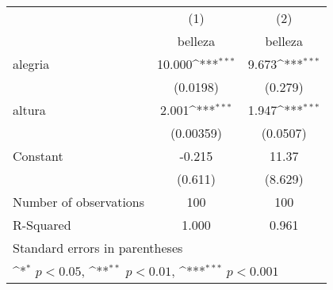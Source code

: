 {
\def\sym#1{\ifmmode^{#1}\else\(^{#1}\)\fi}
\begin{tabular}{l*{2}{c}}
\hline\hline
                    &\multicolumn{1}{c}{(1)}&\multicolumn{1}{c}{(2)}\\
                    &\multicolumn{1}{c}{belleza}&\multicolumn{1}{c}{belleza}\\
\hline
alegria             &      10.000\sym{***}&       9.673\sym{***}\\
                    &    (0.0198)         &     (0.279)         \\
[1em]
altura              &       2.001\sym{***}&       1.947\sym{***}\\
                    &   (0.00359)         &    (0.0507)         \\
[1em]
Constant            &      -0.215         &       11.37         \\
                    &     (0.611)         &     (8.629)         \\
\hline
Number of observations&         100         &         100         \\
R-Squared           &       1.000         &       0.961         \\
\hline\hline
\multicolumn{3}{l}{\footnotesize Standard errors in parentheses}\\
\multicolumn{3}{l}{\footnotesize \sym{*} \(p<0.05\), \sym{**} \(p<0.01\), \sym{***} \(p<0.001\)}\\
\end{tabular}
}
